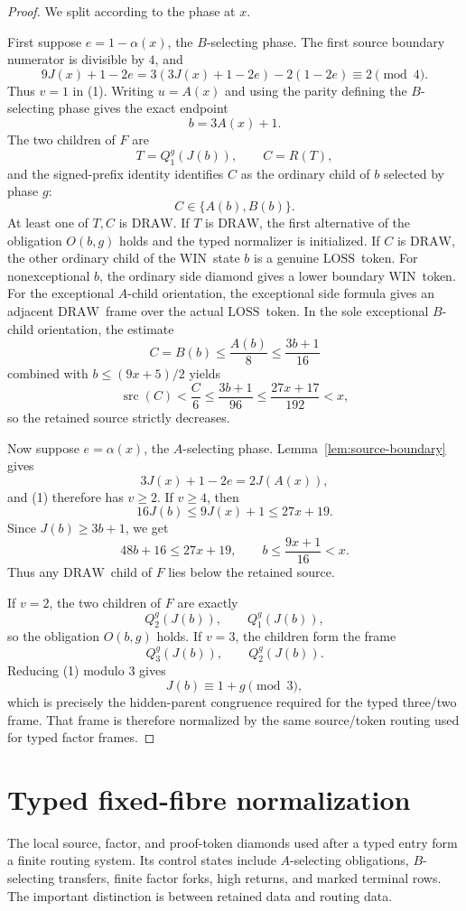 \documentclass[11pt]{article}
\newcommand{\WIN}{\ensuremath{\mathrm{WIN}}}
\newcommand{\LOSS}{\ensuremath{\mathrm{LOSS}}}
\newcommand{\DRAW}{\ensuremath{\mathrm{DRAW}}}
\newcommand{\src}{\operatorname{src}}
\begin{document}
\begin{proof}
We split according to the phase at $x$.

First suppose $e=1-\alpha(x)$, the $B$-selecting phase. The first source
boundary numerator is divisible by $4$, and
\[
  9J(x)+1-2e=3(3J(x)+1-2e)-2(1-2e)\equiv2\pmod4.
\]
Thus $v=1$ in (1). Writing $u=A(x)$ and using the parity defining the
$B$-selecting phase gives the exact endpoint
\[
  b=3A(x)+1.
\]
The two children of $F$ are
\[
  T=Q_1^g(J(b)),\qquad C=R(T),
\]
and the signed-prefix identity identifies $C$ as the ordinary child of $b$
selected by phase $g$:
\[
  C\in\{A(b),B(b)\}.
\]
At least one of $T,C$ is \DRAW. If $T$ is \DRAW, the first alternative of the
obligation $O(b,g)$ holds and the typed normalizer is initialized. If $C$ is
\DRAW, the other ordinary child of the \WIN\ state $b$ is a genuine \LOSS\
token. For nonexceptional $b$, the ordinary side diamond gives a lower boundary
\WIN\ token. For the exceptional $A$-child orientation, the exceptional side
formula gives an adjacent \DRAW\ frame over the actual \LOSS\ token. In the
sole exceptional $B$-child orientation, the estimate
\[
  C=B(b)\le \frac{A(b)}8\le \frac{3b+1}{16}
\]
combined with $b\le(9x+5)/2$ yields
\[
  \src(C)<\frac{C}{6}\le\frac{3b+1}{96}
  \le\frac{27x+17}{192}<x,
\]
so the retained source strictly decreases.

Now suppose $e=\alpha(x)$, the $A$-selecting phase. Lemma~\ref{lem:source-boundary}
gives
\[
  3J(x)+1-2e=2J(A(x)),
\]
and (1) therefore has $v\ge2$. If $v\ge4$, then
\[
  16J(b)\le 9J(x)+1\le 27x+19.
\]
Since $J(b)\ge3b+1$, we get
\[
  48b+16\le27x+19,
  \qquad
  b\le\frac{9x+1}{16}<x.
\]
Thus any \DRAW\ child of $F$ lies below the retained source.

If $v=2$, the two children of $F$ are exactly
\[
  Q_2^g(J(b)),\qquad Q_1^g(J(b)),
\]
so the obligation $O(b,g)$ holds. If $v=3$, the children form the frame
\[
  Q_3^g(J(b)),\qquad Q_2^g(J(b)).
\]
Reducing (1) modulo $3$ gives
\[
  J(b)\equiv1+g\pmod3,
\]
which is precisely the hidden-parent congruence required for the typed
three/two frame. That frame is therefore normalized by the same source/token
routing used for typed factor frames.
\end{proof}

\section{Typed fixed-fibre normalization}

The local source, factor, and proof-token diamonds used after a typed entry form
a finite routing system. Its control states include $A$-selecting obligations,
$B$-selecting transfers, finite factor forks, high returns, and marked terminal
rows. The important distinction is between retained data and routing data.
\end{document}
